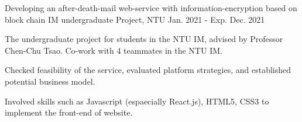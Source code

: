 \begin{cventries}
    {Developing an after-death-mail web-service with information-encryption based on block chain} %
    {IM undergraduate Project, NTU} %
    {Jan. 2021 - Exp. Dec. 2021} %
    {
      \begin{cvitems} %
        \item {The undergraduate project for students in the NTU IM,
            advised by Professor Chen-Chu Tsao. Co-work with 4 teammates in the NTU IM.}
        \item {Checked feasibility of the service, evaluated platform strategies,
            and established potential business model.}
        \item {Involved skills such as Javascript (espaecially React.js),
            HTML5, CSS3 to implement the front-end of website.}
      \end{cvitems}
    }    

\end{cventries}
